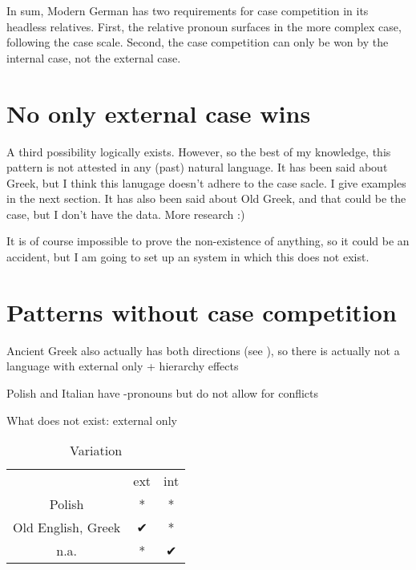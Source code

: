 In sum, Modern German has two requirements for case competition in its headless relatives. First, the relative pronoun surfaces in the more complex case, following the case scale. Second, the case competition can only be won by the internal case, not the external case.

\section{No only external case wins}

A third possibility logically exists. However, so the best of my knowledge, this pattern is not attested in any (past) natural language. It has been said about Greek, but I think this lanugage doesn't adhere to the case sacle. I give examples in the next section. It has also been said about Old Greek, and that could be the case, but I don't have the data. More research :)

It is of course impossible to prove the non-existence of anything, so it could be an accident, but I am going to set up an system in which this does not exist.


\section{Patterns without case competition}

Ancient Greek also actually has both directions (see \cite{vanriemsdijk2006}), so there is actually not a language with external only + hierarchy effects



Polish and Italian have -pronouns but do not allow for conflicts


What does not exist: external only


\begin{table}[H]
 \center
 \caption {Variation}
  \begin{tabular}{ccc}
  \toprule
                      & \ac{ext}  & \ac{int} \\
                      \cmidrule{2-3}
  Polish              & *         & *        \\
  Old English, Greek  & ✔         & *        \\
  n.a.                & *         & ✔        \\
  \bottomrule
\end{tabular}\label{tbl:int-ext-summary}
\end{table}

